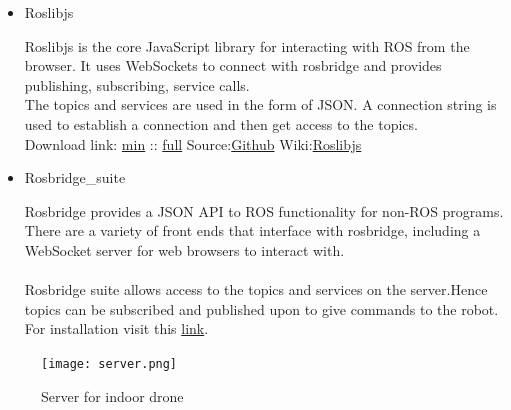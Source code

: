 \documentclass[a4paper,12pt,oneside]{book}
\begin{document}
\begin{itemize}
   
   \item Roslibjs
   
   Roslibjs is the core JavaScript library for interacting with ROS from the browser. It uses WebSockets to connect with rosbridge and provides publishing, subscribing, service calls.\\ The topics and services are used in the form of JSON. A connection string is used to establish a connection and then get access to the topics.\\
   Download link:
   \href{https://static.robotwebtools.org/roslibjs/current/roslib.min.js}{min}
   ::
   \href{https://static.robotwebtools.org/roslibjs/current/roslib.js}{full}
   Source:\href{https://github.com/RobotWebTools/roslibjs}{Github}
   Wiki:\href{http://www.ros.org/wiki/roslibjs/}{Roslibjs}\\
   
  \item Rosbridge\_suite
  
  Rosbridge provides a JSON API to ROS functionality for non-ROS programs. There are a variety of front ends that interface with rosbridge, including a WebSocket server for web browsers to interact with.
  \\\\
  Rosbridge suite allows access to the topics and services on the server.Hence topics can be subscribed and published upon to give commands to the robot.\\ For installation visit this \href{http://wiki.ros.org/rosbridge_suite}{link}.
 \end{itemize} 
  \begin{figure}[H]
  \centering
  \texttt{[image: server.png]}
  \caption{Server for indoor drone}
  \end{figure}
  
\end{document}
